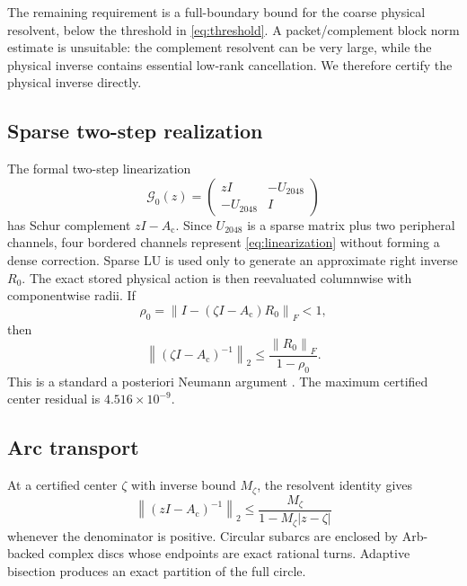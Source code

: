 \documentclass[11pt]{article}
\theoremstyle{definition}
\theoremstyle{remark}
\newcommand{\Id}{I}
\newcommand{\Ac}{A_{\mathrm c}}
\newcommand{\norm}[1]{\left\lVert #1\right\rVert}
\begin{document}
The remaining requirement is a full-boundary bound for the coarse physical
resolvent, below the threshold in \eqref{eq:threshold}.  A
packet/complement block norm estimate is unsuitable: the complement resolvent
can be very large, while the physical inverse contains essential low-rank
cancellation.  We therefore certify the physical inverse directly.

\subsection{Sparse two-step realization}

The formal two-step linearization
\begin{equation}
 \mathcal G_0(z)=
 \begin{pmatrix}
  z\Id&-U_{2048}\\
  -U_{2048}&\Id
 \end{pmatrix}
 \label{eq:linearization}
\end{equation}
has Schur complement \(z\Id-\Ac\).  Since \(U_{2048}\) is a sparse matrix plus
two peripheral channels, four bordered channels represent
\eqref{eq:linearization} without forming a dense correction.  Sparse LU is
used only to generate an approximate right inverse \(R_0\).  The exact stored
physical action is then reevaluated columnwise with componentwise radii.  If
\begin{equation}
 \rho_0=\norm{\Id-(\zeta\Id-\Ac)R_0}_F<1,
 \label{eq:center-residual}
\end{equation}
then
\begin{equation}
 \norm{(\zeta\Id-\Ac)^{-1}}_2
 \le\frac{\norm{R_0}_F}{1-\rho_0}.
 \label{eq:center-bound}
\end{equation}
This is a standard a posteriori Neumann argument
\citep{Higham2002,Rump2010}.  The maximum certified center residual is
\(4.516\times10^{-9}\).

\subsection{Arc transport}

At a certified center \(\zeta\) with inverse bound \(M_\zeta\), the resolvent
identity gives
\begin{equation}
 \norm{(z\Id-\Ac)^{-1}}_2
 \le\frac{M_\zeta}{1-M_\zeta|z-\zeta|}
 \label{eq:transport}
\end{equation}
whenever the denominator is positive.  Circular subarcs are enclosed by
Arb-backed complex discs whose endpoints are exact rational turns.  Adaptive
bisection produces an exact partition of the full circle.
\end{document}
